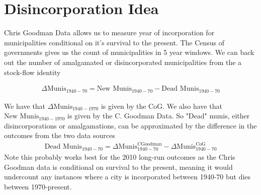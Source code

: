 \documentclass{article}
\begin{document}
\clearpage
\begin{table}
\footnotesize
\centering
\caption{Mechs Imbal}
\begin{threeparttable}
\scriptsize

\end{threeparttable}
\label{tab:log_effect}
\end{table}
\clearpage

\clearpage
\begin{table}
\footnotesize
\centering
\caption{Log Changes}
\begin{threeparttable}
\scriptsize

\end{threeparttable}
\label{tab:log_effect}
\end{table}
\clearpage


\clearpage
\begin{table}
\footnotesize
\centering
\caption{Pctile imbal ssagg}
\begin{threeparttable}
\scriptsize

\end{threeparttable}
\label{tab:log_effect}
\end{table}
\clearpage


\clearpage
\begin{table}
\footnotesize
\centering
\caption{Pctile imbal norm}
\begin{threeparttable}
\scriptsize

\end{threeparttable}
\label{tab:log_effect}
\end{table}
\clearpage


\section{Disincorporation Idea}

Chris Goodman Data allows us to measure year of incorporation for municipalities conditional on it's survival to the present. The Census of governments gives us the count of municipalities in 5 year windows. We can back out the number of amalgamated or disincorporated municipalities from the a stock-flow identity

\begin{align*}
	\Delta \text{Munis}_{1940-70} = \text{New Munis}_{1940-70} - \text{Dead Munis}_{1940-70}
\end{align*}

We have that $\Delta \text{Munis}_{1940-1970}$ is given by the CoG. We also have that $\text{New Munis}_{1940-1970}$ is given by the C. Goodman Data. So "Dead" munis, either disincorporations or amalgamations, can be approximated by the difference in the outcomes from the two data sources
\begin{align*}
	\text{Dead Munis}_{1940-70} = \Delta \text{Munis}_{1940-70}^{\text{CGoodman}} -  \Delta \text{Munis}_{1940-70}^{\text{CoG}}
\end{align*}
Note this probably works best for the 2010 long-run outcomes as the Chris Goodman data is conditional on survival to the present, meaning it would undercount any instances where a city is incorporated between 1940-70 but dies between 1970-present.
\end{document}
